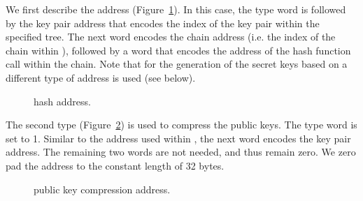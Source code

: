    We first describe the \wotsp address (Figure~\ref{fig:adrs:wots}).
   In this case, the type word
   is followed by the key pair address that encodes the index of the \wotsp
   key pair within the specified tree.  The next word encodes the chain address
   (i.e. the index of the chain within \wotsp),
   followed by a word that encodes the address of the hash function call
   within the chain. Note that for the generation of the secret keys based on \sseed a different type of address is used (see below).

\begin{figure}[h]
  \centering
  \caption{\wotsp hash address.}
  \label{fig:adrs:wots}
\end{figure}


  The second type (Figure~\ref{fig:adrs:wotspk}) is used to compress the \wotsp public keys. The type word is
  set to 1. Similar to the address used within \wotsp, the next word encodes
  the key pair address. The remaining two words are not needed, and thus remain zero.
  We zero pad the address to the constant length of 32 bytes.

\begin{figure}[h]
  \centering
  \caption{\wotsp public key compression address.}
  \label{fig:adrs:wotspk}
\end{figure}


